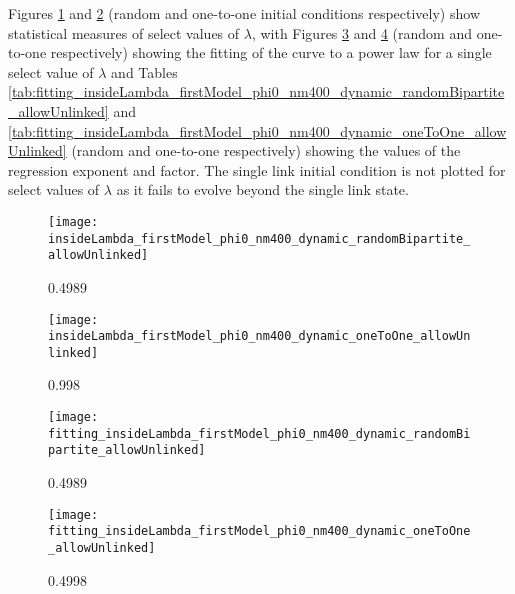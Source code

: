 Figures \ref{fig:insideLambda_firstModel_phi0_nm400_dynamic_randomBipartite_allowUnlinked} and \ref{fig:insideLambda_firstModel_phi0_nm400_dynamic_oneToOne_allowUnlinked} (random and one-to-one initial conditions respectively) show statistical measures of select values of $\lambda$, with Figures \ref{fig:fitting_insideLambda_firstModel_phi0_nm400_dynamic_randomBipartite_allowUnlinked} and \ref{fig:fitting_insideLambda_firstModel_phi0_nm400_dynamic_oneToOne_allowUnlinked} (random and one-to-one respectively) showing the fitting of the curve to a power law for a single select value of $\lambda$ and Tables \ref{tab:fitting_insideLambda_firstModel_phi0_nm400_dynamic_randomBipartite_allowUnlinked} and \ref{tab:fitting_insideLambda_firstModel_phi0_nm400_dynamic_oneToOne_allowUnlinked} (random and one-to-one respectively) showing the values of the regression exponent and factor.
The single link initial condition is not plotted for select values of $\lambda$ as it fails to evolve beyond the single link state.

\begin{figure}
  \centering
  \texttt{[image: insideLambda\_firstModel\_phi0\_nm400\_dynamic\_randomBipartite\_allowUnlinked]}
  \caption{0.4989}
  \label{fig:insideLambda_firstModel_phi0_nm400_dynamic_randomBipartite_allowUnlinked}
\end{figure}

\begin{figure}
  \centering
  \texttt{[image: insideLambda\_firstModel\_phi0\_nm400\_dynamic\_oneToOne\_allowUnlinked]}
  \caption{0.998}
  \label{fig:insideLambda_firstModel_phi0_nm400_dynamic_oneToOne_allowUnlinked}
\end{figure}

\begin{figure}
  \centering
  \texttt{[image: fitting\_insideLambda\_firstModel\_phi0\_nm400\_dynamic\_randomBipartite\_allowUnlinked]}
  \caption{0.4989}
  \label{fig:fitting_insideLambda_firstModel_phi0_nm400_dynamic_randomBipartite_allowUnlinked}
\end{figure}

\begin{figure}
  \centering
  \texttt{[image: fitting\_insideLambda\_firstModel\_phi0\_nm400\_dynamic\_oneToOne\_allowUnlinked]}
  \caption{0.4998}
  \label{fig:fitting_insideLambda_firstModel_phi0_nm400_dynamic_oneToOne_allowUnlinked}
\end{figure}



